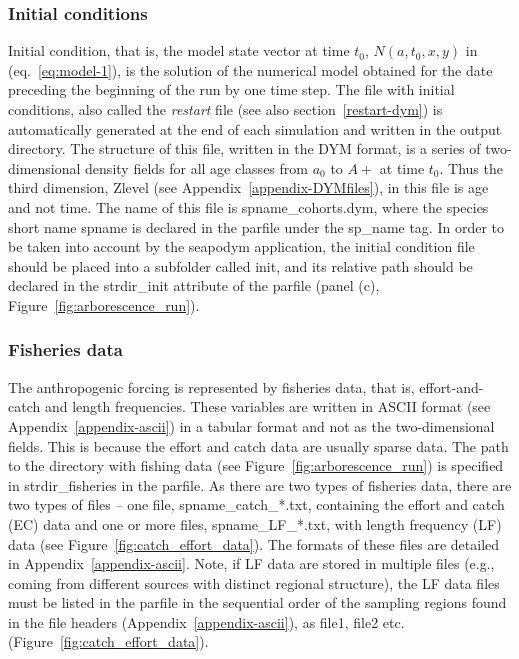 \subsubsection{Initial conditions} 
\label{sec:init-dym}
Initial condition, that is, the model state vector at time $t_0$, $N(a,t_0,x,y)$ in (eq.~\ref{eq:model-1}), is the solution of the numerical model obtained for the date preceding the beginning of the run by one time step. The file with initial conditions, also called the  \textit{restart} file (see also section~\ref{restart-dym}) is automatically generated at the end of each simulation and written in the output directory. The structure of this file, written in the DYM format, is a series of two-dimensional density fields for all age classes from $a_0$ to $A+$ at time $t_0$. Thus the third dimension, {\ttfamily Zlevel} (see Appendix~\ref{appendix-DYMfiles}), in this file is age and not time. The name of this file is spname\_cohorts.dym, where the species short name {\ttfamily spname} is declared in the parfile under the {\ttfamily sp\_name} tag. In order to be taken into account by the seapodym application, the initial condition file should be placed into a subfolder called {\ttfamily init}, and its relative path should be declared in the {\ttfamily strdir\_init} attribute of the parfile (panel (c), Figure~\ref{fig:arborescence_run}).  


\subsubsection{Fisheries data}
\label{sec:fishing-data}
The anthropogenic forcing is represented by fisheries data, that is, effort-and-catch and length frequencies. These variables are written in ASCII format (see Appendix~\ref{appendix-ascii}) in a tabular format and not as the two-dimensional fields. This is because the effort and catch data are usually sparse data. The path to the directory with fishing data (see Figure~\ref{fig:arborescence_run}) is specified in \textcolor{BrickRed}{{\ttfamily strdir\_fisheries}} in the parfile. As there are two types of fisheries data, there are two types of files -- one file, spname\_catch\_*.txt, containing the effort and catch (EC) data and one or more files, spname\_LF\_*.txt, with length frequency (LF) data (see Figure~\ref{fig:catch_effort_data}). The formats of these files are detailed in Appendix~\ref{appendix-ascii}. Note, if LF data are stored in multiple files (e.g., coming from different sources with distinct regional structure), the LF data files must be listed in the parfile in the sequential order of the sampling regions found in the file headers (Appendix~\ref{appendix-ascii}), as file1, file2 etc. (Figure~\ref{fig:catch_effort_data}). 

